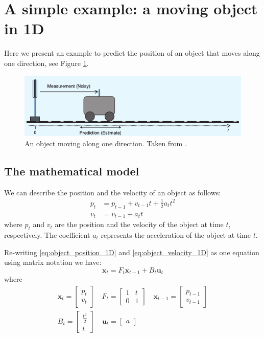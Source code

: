\documentclass[12pt,a4paper,final]{article} %
\newcommand{\vect}[1]{\mathbf{#1}}
\begin{document}
\section{A simple example: a moving object in 1D}
\label{sec:example1D}
Here we present an example to predict the position of an object that
moves along one direction, see Figure \ref{fig:object_1D_00}.
\begin{figure}
  \centering
  \includegraphics[width=1.0\textwidth]{object_1D_00}
  \caption{An object moving along one direction. Taken from
    \cite{Faragher:2012:AR}.}
  \label{fig:object_1D_00}
\end{figure}

\subsection{The mathematical model}
We can describe the position and the velocity of an object as follows:
\begin{align}
  p_t &= p_{t-1} + v_{t-1} t + \frac{1}{2} a_t t^2 \label{eq:object_position_1D}\\
  v_t &= v_{t-1} + a_{t} t \label{eq:object_velocity_1D}
\end{align}
where $p_t$ and $v_t$ are the position and the velocity of the object
at time $t$, respectively. The coefficient $a_t$ represents the
acceleration of the object at time $t$.

Re-writing \eqref{eq:object_position_1D} and
\eqref{eq:object_velocity_1D} as one equation using matrix notation we
have:
\begin{equation}
  \label{eq:one_d_matrix_form}
  \vect{x}_t = F_t \vect{x}_{t-1} + B_t \vect{u}_t
\end{equation}
where
\begin{align}
  \vect{x}_t =
  \begin{bmatrix}
    p_t \\
    v_t
  \end{bmatrix}
  \quad
  F_t =
  \begin{bmatrix}
    1 & t\\
    0 & 1
  \end{bmatrix}
  \quad
  \vect{x}_{t-1} =
  \begin{bmatrix}
    p_{t-1} \\
    v_{t-1}
  \end{bmatrix}\\
  B_t = 
  \begin{bmatrix}
    \frac{t^2}{2} \\
    t
  \end{bmatrix}
  \quad
  \vect{u}_t =
  \begin{bmatrix}
    a
  \end{bmatrix}
\end{align}
\end{document}

